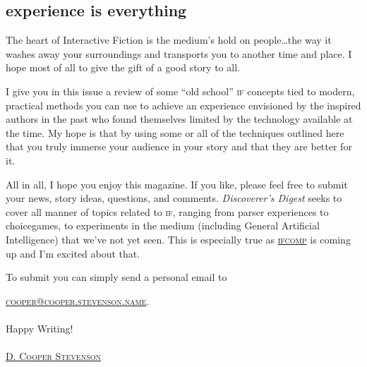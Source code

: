 \subsection{experience is everything}
\label{sec:experience_everything}
The heart of Interactive Fiction is the medium's hold on people\ldots the way it
washes away your surroundings and transports you to another time and place. I
hope most of all to give the gift of a good story to all.

I give you in this issue a review of some ``old school'' \textsc{if} concepts
tied to modern, practical methods you can use to achieve an experience envisioned by the inspired authors in the past who found themselves
limited by the technology available at the time. My hope is that by using some
or all of the techniques outlined here that you truly immerse your
audience in your story and that they are better for it. 

All in all, I hope you enjoy this magazine. If you like, please feel free to submit your news,
story ideas, questions, and comments. \textit{Discoverer's Digest} seeks to
cover all manner of topics related to \textsc{if}, ranging from parser
experiences to choice\textemdash games, to experiments in the medium (including
General Artificial Intelligence) that we've not yet seen. This is especially true as
\href{https://ifcomp.org/}{\textsc{ifcomp}} is coming up and I'm excited about
that.

To submit you can simply send a personal email to

\href{mailto:cooper@cooper.stevenson.name}{\textsc{cooper@cooper.stevenson.name}}. \\ \\

\noindent Happy Writing! \\ \\

\noindent \href{mailto:cooper@cooper.stevenson.name}{\textsc{D. Cooper Stevenson}}

